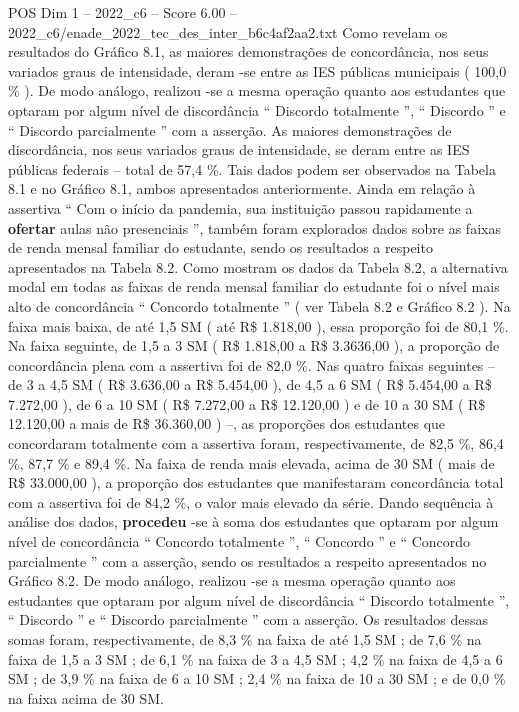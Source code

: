 \begin{textsample}{POS Dim 1 – 2022\_c6 – Score 6.00 – 2022\_c6/enade\_2022\_tec\_des\_inter\_b6c4af2aa2.txt}
Como revelam os resultados do Gráfico 8.1, as maiores demonstrações de concordância, nos seus variados graus de intensidade, deram -se entre as IES públicas municipais ( 100,0 \% ).
De modo análogo, realizou -se a mesma operação quanto aos estudantes que optaram por algum nível de discordância “ Discordo totalmente ”, “ Discordo ” e “ Discordo parcialmente ” com a asserção.
As maiores demonstrações de discordância, nos seus variados graus de intensidade, se deram entre as IES públicas federais – total de 57,4 \%.
Tais dados podem ser observados na Tabela 8.1 e no Gráfico 8.1, ambos apresentados anteriormente.
Ainda em relação à assertiva “ Com o início da pandemia, sua instituição passou rapidamente a \textbf{ofertar} aulas não presenciais ”, também foram explorados dados sobre as faixas de renda mensal familiar do estudante, sendo os resultados a respeito apresentados na Tabela 8.2.
Como mostram os dados da Tabela 8.2, a alternativa modal em todas as faixas de renda mensal familiar do estudante foi o nível mais alto de concordância “ Concordo totalmente ” ( ver Tabela 8.2 e Gráfico 8.2 ).
Na faixa mais baixa, de até 1,5 SM ( até R\$ 1.818,00 ), essa proporção foi de 80,1 \%.
Na faixa seguinte, de 1,5 a 3 SM ( R\$ 1.818,00 a R\$ 3.3636,00 ), a proporção de concordância plena com a assertiva foi de 82,0 \%.
Nas quatro faixas seguintes – de 3 a 4,5 SM ( R\$ 3.636,00 a R\$ 5.454,00 ), de 4,5 a 6 SM ( R\$ 5.454,00 a R\$ 7.272,00 ), de 6 a 10 SM ( R\$ 7.272,00 a R\$ 12.120,00 ) e de 10 a 30 SM ( R\$ 12.120,00 a mais de R\$ 36.360,00 ) –, as proporções dos estudantes que concordaram totalmente com a assertiva foram, respectivamente, de 82,5 \%, 86,4 \%, 87,7 \% e 89,4 \%.
Na faixa de renda mais elevada, acima de 30 SM ( mais de R\$ 33.000,00 ), a proporção dos estudantes que manifestaram concordância total com a assertiva foi de 84,2 \%, o valor mais elevado da série.
Dando sequência à análise dos dados, \textbf{procedeu} -se à soma dos estudantes que optaram por algum nível de concordância “ Concordo totalmente ”, “ Concordo ” e “ Concordo parcialmente ” com a asserção, sendo os resultados a respeito apresentados no Gráfico 8.2.
De modo análogo, realizou -se a mesma operação quanto aos estudantes que optaram por algum nível de discordância “ Discordo totalmente ”, “ Discordo ” e “ Discordo parcialmente ” com a asserção.
Os resultados dessas somas foram, respectivamente, de 8,3 \% na faixa de até 1,5 SM ; de 7,6 \% na faixa de 1,5 a 3 SM ; de 6,1 \% na faixa de 3 a 4,5 SM ; 4,2 \% na faixa de 4,5 a 6 SM ; de 3,9 \% na faixa de 6 a 10 SM ; 2,4 \% na faixa de 10 a 30 SM ; e de 0,0 \% na faixa acima de 30 SM.

\end{textsample}
